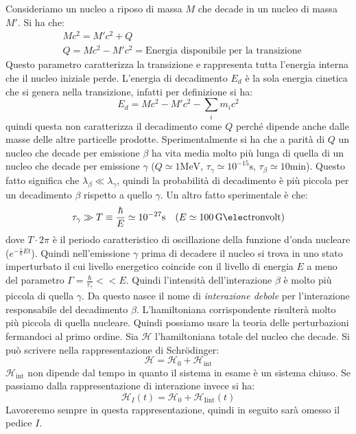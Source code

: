 Consideriamo un nucleo a riposo di massa $M$ che decade in un nucleo di massa 
$M'$. Si ha che:
\begin{align*}
&Mc^2=M'c^2+Q\\
&Q=Mc^2-M'c^2=\text{Energia disponibile per la transizione}
\end{align*}
Questo parametro caratterizza la transizione e rappresenta tutta l'energia 
interna che il nucleo iniziale perde. L'energia di decadimento $E_d$ è la sola 
energia cinetica
che si genera nella transizione, infatti per definizione si ha:
\[
E_d=Mc^2-M'c^2-\sum_i m_ic^2
\]
quindi questa non caratterizza il decadimento come $Q$ perché dipende anche 
dalle masse delle altre particelle prodotte. Sperimentalmente si ha che a 
parità di $Q$ un nucleo che decade
per emissione $\beta$ ha vita media molto più lunga di quella di un nucleo che 
decade per emissione $\gamma$ ($Q\simeq1\si{\mega\electronvolt}$, 
$\tau_{\gamma}\simeq10^{-15}\si{\second}$,
$\tau_{\beta}\simeq10\text{min}$).
Questo fatto significa che $\lambda_{\beta}\ll\lambda_{\gamma}$, quindi la 
probabilità di decadimento è più piccola per un decadimento $\beta$ rispetto 
a quello $\gamma$.
Un altro fatto sperimentale è che:
\[
\tau_{\gamma}\gg 
T\equiv\frac{\hbar}{E}\simeq10^{-27}\si{\second}\quad(E\simeq100\,\si{\giga\elec
tronvolt})
\]
dove $T\cdot2\pi$ è il periodo caratteristico di oscillazione della funzione 
d'onda nucleare ($e^{-\frac{i}{\hbar}Et}$). Quindi nell'emissione $\gamma$ 
prima di decadere il nucleo
si trova in uno stato imperturbato il cui livello energetico coincide con il 
livello di energia $E$ a meno del parametro 
$\Gamma=\frac{\hbar}{\tau_{\gamma}}<<E$. Quindi l'intensità
dell'interazione $\beta$ è molto più piccola di quella $\gamma$. Da questo 
nasce il nome di \textit{interazione debole} per l'interazione responsabile del 
decadimento $\beta$.
L'hamiltoniana corrispondente risulterà molto più piccola di quella nucleare. 
Quindi possiamo usare la teoria delle perturbazioni fermandoci al primo ordine.
Sia $\mathcal{H}$ l'hamiltoniana totale del nucleo che decade. Si può scrivere 
nella rappresentazione di Schr\"{o}dinger:
\[
\mathcal{H}=\mathcal{H}_0+\mathcal{H}_{\text{int}}
\]
$\mathcal{H}_{\text{int}}$ non dipende dal tempo in quanto il sistema in esame 
è un sistema chiuso. Se passiamo dalla rappresentazione di interazione invece 
si ha:
\[
\mathcal{H}_I(t)=\mathcal{H}_0+\mathcal{H}_{\text{Iint}}(t)
\]
Lavoreremo sempre in questa rappresentazione, quindi in seguito sarà omesso il 
pedice $I$.

